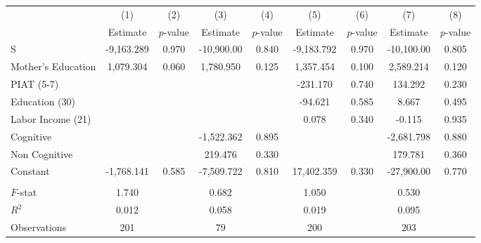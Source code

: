 \begin{tabular}{lcccccccc} \toprule
 & (1) & (2) & (3) & (4) & (5) & (6) & (7) & (8) \\ 
 & Estimate  & $p$-value  & Estimate  & $p$-value  & Estimate  & $p$-value  & Estimate  & $p$-value  \\  \midrule
S & -9,163.289 &     0.970 & -10,900.00 &     0.840 & -9,183.792 &     0.970 & -10,100.00 &     0.805 \\  
Mother's Education &  1,079.304 &     0.060 &  1,780.950 &     0.125 &  1,357.454 &     0.100 &  2,589.214 &     0.120 \\  
PIAT (5-7) &         &         &         &         &  -231.170 &     0.740 &   134.292 &     0.230 \\  
Education (30) &         &         &         &         &   -94.621 &     0.585 &     8.667 &     0.495 \\  
Labor Income (21) &         &         &         &         &     0.078 &     0.340 &    -0.115 &     0.935 \\  
Cognitive &         &         & -1,522.362 &     0.895 &         &         & -2,681.798 &     0.880 \\  
Non Cognitive &         &         &   219.476 &     0.330 &         &         &   179.781 &     0.360 \\  
Constant & -1,768.141 &     0.585 & -7,509.722 &     0.810 & 17,402.359 &     0.330 & -27,900.00 &     0.770 \\  \\ \midrule
$F$-stat &     1.740 &         &     0.682 &         &     1.050 &         &     0.530 &        \\
$R^2$ &     0.012 &         &     0.058 &         &     0.019 &         &     0.095 &        \\
Observations &   201 &         &    79 &         &   200 &         &   203  &        \\
\bottomrule  \end{tabular}
